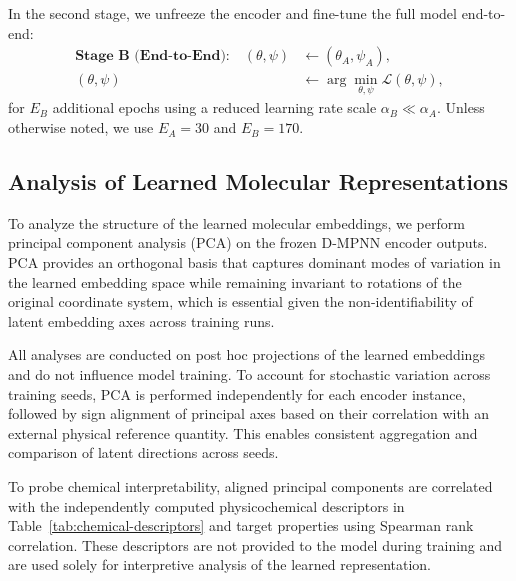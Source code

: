In the second stage, we unfreeze the encoder and fine-tune the full model end-to-end:
\begin{equation}
\begin{aligned}
\textbf{Stage B (End-to-End):}\quad
(\theta,\psi) &\leftarrow (\theta_A,\psi_A), \\
(\theta,\psi) &\leftarrow \arg\min_{\theta,\psi} \mathcal{L}(\theta,\psi),
\end{aligned}
\end{equation}
for $E_B$ additional epochs using a reduced learning rate scale $\alpha_B \ll \alpha_A$.
Unless otherwise noted, we use $E_A=30$ and $E_B=170$.


\subsection{Analysis of Learned Molecular Representations}

To analyze the structure of the learned molecular embeddings, we perform principal component analysis (PCA) on the frozen D-MPNN encoder outputs. PCA provides an orthogonal basis that captures dominant modes of variation in the learned embedding space while remaining invariant to rotations of the original coordinate system, which is essential given the non-identifiability of latent embedding axes across training runs.

All analyses are conducted on post hoc projections of the learned embeddings and do not influence model training. To account for stochastic variation across training seeds, PCA is performed independently for each encoder instance, followed by sign alignment of principal axes based on their correlation with an external physical reference quantity. This enables consistent aggregation and comparison of latent directions across seeds.

To probe chemical interpretability, aligned principal components are correlated with the independently computed physicochemical descriptors in Table~\ref{tab:chemical-descriptors} and target properties using Spearman rank correlation. These descriptors are not provided to the model during training and are used solely for interpretive analysis of the learned representation.

